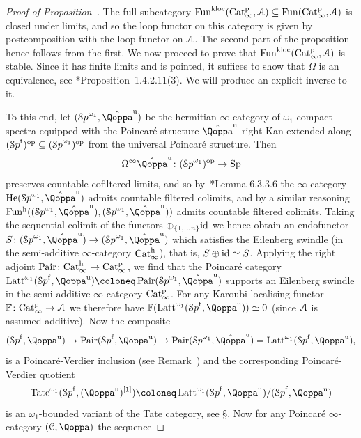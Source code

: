 \begin{proof}[Proof of Proposition~]
The full subcategory $\operatorname{Fun}^{\mathrm{kloc}}(\mathrm{Cat}^{\mathrm p}_\infty,\mathcal{A}) \subseteq \operatorname{Fun}(\mathrm{Cat}^{\mathrm p}_\infty,\mathcal{A})$ is closed under limits, and so the loop functor on this category is given by postcomposition with the loop functor on $\mathcal{A}$. The second part of the proposition hence follows from the first. We now proceed to prove that $\operatorname{Fun}^{\mathrm{kloc}}(\mathrm{Cat}^{\mathrm p}_\infty,\mathcal{A})$ is stable. Since it has finite limits and is pointed, it suffices to show that $\Omega$ is an equivalence, see \cite{HA}*{Proposition~1.4.2.11(3)}. We will produce an explicit inverse to it.

To this end, let $(\Spa^{\omega_1},\hat{\QF}^{\uni})$ be the hermitian $\infty$-category of $\omega_1$-compact spectra equipped with the Poincaré structure $\hat{\QF}^{\uni}$ right Kan extended along $({\mathcal Sp}^{\mathrm{f}})^\mathrm{op} \subseteq ({\mathcal Sp}^{\omega_1})^\mathrm{op}$ from the universal Poincaré structure. Then 
\[
\Om^{\infty}\hat{\QF}^{\uni}\colon (\Spa^{\omega_1})\op \to \Sp
\]
preserves countable cofiltered limits,
and so by~\cite{HTT}*{Lemma 6.3.3.6} the $\infty$-category $\catforms(\Spa^{\omega_1},\hat{\QF}^{\uni})$ admits countable filtered colimits, and by a similar reasoning $\Funh((\Spa^{\omega_1},\hat{\QF}^{\uni}),(\Spa^{\omega_1},\hat{\QF}^{\uni}))$ admits countable filtered colimits. Taking the sequential colimit of the functors $\oplus_{\{1,...n\}}\mathrm{id}$ we hence obtain an endofunctor $S\colon (\Spa^{\omega_1},\hat{\QF}^{\uni}) \to (\Spa^{\omega_1},\hat{\QF}^{\uni})$ which satisfies the
Eilenberg swindle (in the semi-additive $\infty$-category $\mathrm{Cat}^\mathrm{h}_\infty$), 
that is, $S\oplus \mathrm{id} \simeq S$. Applying the right adjoint $\operatorname{Pair}\colon \mathrm{Cat}^\mathrm{h}_\infty \to \mathrm{Cat}^{\mathrm p}_\infty$, we find that the Poincar\'e category $\Latt^{\omega_1}(\Spaf, \QF^{\uni}) \coloneq \Pairings(\Spa^{\omega_1},\hat{\QF}^{\uni})$ supports an Eilenberg swindle in the semi-additive $\infty$-category $\mathrm{Cat}^{\mathrm p}_\infty$. For any Karoubi-localising functor $\mathbb{F}\colon \mathrm{Cat}^{\mathrm p}_\infty\to \mathcal{A}$ we therefore have $\FF(\Latt^{\omega_1}(\Spaf, \QF^{\uni}))\simeq 0$ (since $\mathcal{A}$ is assumed additive). Now the composite
\[
(\Spaf,\QF^\uni) \to\Pairings(\Spaf,\QF^\uni)\to \Pairings(\Spa^{\omega_1},\hat{\QF}^{\uni}) = \Latt^{\omega_1}(\Spaf, \QF^{\uni}),
\]
is a Poincaré-Verdier inclusion (see Remark~) and the corresponding Poincaré-Verdier quotient %
\[
\Tate^{\omega_1}(\Spaf, (\QF^{\uni})\qshift{1}) \coloneq \Latt^{\omega_1}(\Spaf, \QF^{\uni})/(\Spaf,\QF^\uni)
\]
is an $\omega_1$-bounded variant of the Tate category, see \S{}. %
Now for any Poincaré $\infty$-category $(\C,\QF)$ the sequence

\end{proof}
